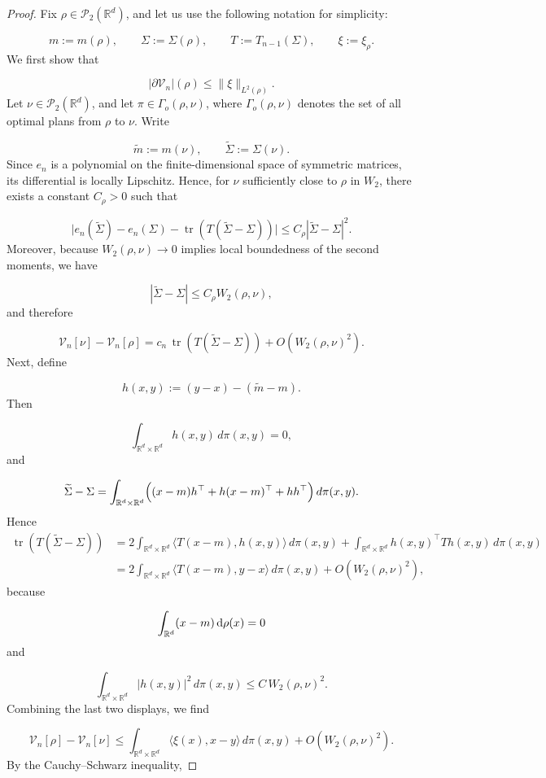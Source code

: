 \documentclass[11pt,reqno]{amsart}
\numberwithin{figure}{section}
\def\d {{\partial}}
\newcommand{\bbr}{\mathbb R}
\def\d{\mathrm{d}}
\newcommand{\dm}{d}
\renewcommand{\d}{  {\textup{d}} }
\begin{document}
\begin{proof}
Fix $\rho\in\mathcal{P}_2(\mathbb{R}^d)$, and let us use the following notation for simplicity:

\[ m:=m(\rho), \qquad \Sigma:=\Sigma(\rho), \qquad T:=T_{n-1}(\Sigma), \qquad \xi:=\xi_\rho. \] 
We first show that 

\[ |\partial \mathcal V_n|(\rho)\le \|\xi\|_{L^2(\rho)}. \] 
Let $\nu\in\mathcal P_2(\mathbb R^d)$, and let $\pi\in\Gamma_o(\rho,\nu)$, where $\Gamma_o(\rho,\nu)$ denotes the set of all optimal plans from $\rho$ to $\nu$. Write 

\[ \widetilde m:=m(\nu), \qquad \widetilde\Sigma:=\Sigma(\nu). \] 
Since $e_n$ is a polynomial on the finite-dimensional space of symmetric matrices, its differential is locally Lipschitz. Hence, for $\nu$ sufficiently close to $\rho$ in $W_2$, there exists a constant $C_\rho>0$ such that 

\[ \bigl|e_n(\widetilde\Sigma)-e_n(\Sigma)-\operatorname{tr}(T(\widetilde\Sigma-\Sigma))\bigr| \le C_\rho |\widetilde\Sigma-\Sigma|^2. \] 
Moreover, because $W_2(\rho,\nu)\to0$ implies local boundedness of the second moments, we have 

\[ |\widetilde\Sigma-\Sigma| \le C_\rho W_2(\rho,\nu), \] 
and therefore 

\[ \mathcal V_n[\nu]-\mathcal V_n[\rho] = c_n\,\operatorname{tr}(T(\widetilde\Sigma-\Sigma)) + O\!\left(W_2(\rho,\nu)^2\right). \] 
Next, define 

\[ h(x,y):=(y-x)-(\widetilde m-m). \] 
Then

\[ \int_{\bbr^\dm\times\bbr^\dm} h(x,y)\,d\pi(x,y)=0, \] and 

\[ \widetilde\Sigma-\Sigma = \int_{\bbr^\dm\times\bbr^\dm} \Bigl((x-m)h^\top+h(x-m)^\top+hh^\top\Bigr)\,d\pi(x,y). \] 
Hence 
\[ \begin{aligned} \operatorname{tr}(T(\widetilde\Sigma-\Sigma)) &= 2\int_{\bbr^\dm\times\bbr^\dm} \langle T(x-m),h(x,y)\rangle\,d\pi(x,y) + \int_{\bbr^\dm\times\bbr^\dm} h(x,y)^\top T h(x,y)\,d\pi(x,y) \\ &= 2\int_{\bbr^\dm\times\bbr^\dm} \langle T(x-m),y-x\rangle\,d\pi(x,y) + O\!\left(W_2(\rho,\nu)^2\right), \end{aligned} \] 
because 

\[ \int_{\bbr^\dm} (x-m)\,\d\rho(x)=0 \] 
and 

\[ \int_{\bbr^\dm\times\bbr^\dm} |h(x,y)|^2\,d\pi(x,y)\le C\,W_2(\rho,\nu)^2. \] 
Combining the last two displays, we find

\[ \mathcal V_n[\rho]-\mathcal V_n[\nu] \le \int_{\mathbb R^d\times\mathbb R^d} \langle \xi(x),x-y\rangle\,d\pi(x,y) + O\!\left(W_2(\rho,\nu)^2\right). \] 
By the Cauchy--Schwarz inequality,


\end{proof}
\end{document}
